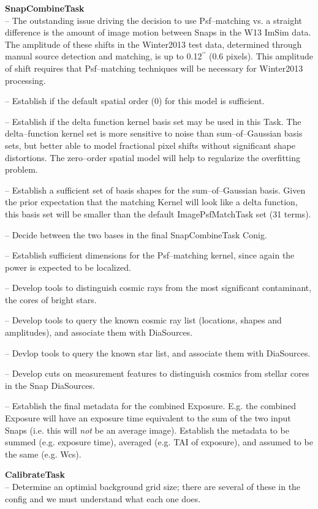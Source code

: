 \documentclass[12pt]{article}
\def\arcsec{^{\prime\prime}}
\begin{document}
{\bf SnapCombineTask}\\

-- The outstanding issue driving the decision to use Psf--matching vs. a straight difference
is the amount of image motion between Snaps in the W13 ImSim data.
The amplitude of these shifts in the Winter2013 test data, determined
through manual source detection and matching, is up to 0.12$\arcsec$
(0.6 pixels).  This amplitude of shift requires that Psf--matching techniques will be necessary for Winter2013 processing.  

-- Establish if the default spatial order (0) for this model is sufficient.

-- Establish if the delta function kernel basis set may be used in this Task.
 The delta--function kernel set is more sensitive
to noise than sum--of--Gaussian basis sets, but better able to model
fractional pixel shifts without significant shape distortions.  The
zero--order spatial model will help to regularize the overfitting
problem.

-- Establish a sufficient set of basis shapes for the sum--of--Gaussian basis.
Given the prior expectation that the matching Kernel will look like a delta function, 
this basis set will be smaller than the default ImagePsfMatchTask set (31 terms).

-- Decide between the two bases in the final SnapCombineTask Conig.

-- Establish sufficient dimensions for the Psf--matching kernel, since again
the power is expected to be localized.

-- Develop tools to distinguish cosmic rays from the most significant
contaminant, the cores of bright stars.  

-- Develop tools to query the known cosmic ray list (locations, shapes and amplitudes), 
and associate them with DiaSources.

-- Devlop tools to query the known star list, and associate them with DiaSources.

-- Develop cuts on measurement features to distinguish cosmics from
stellar cores in the Snap DiaSources.

-- Establish the final metadata for the combined Exposure.  E.g. the
combined Exposure will have an exposure time equivalent to the sum of
the two input Snaps (i.e. this will {\it not} be an average image).  Establish
the metadata to be summed (e.g. exposure time), averaged (e.g. TAI of exposure), 
and assumed to be the same (e.g. Wcs).

{\bf CalibrateTask}\\
-- Determine an optimial background grid size; there are several of these in the config
  and we must understand what each one does.
\end{document}
